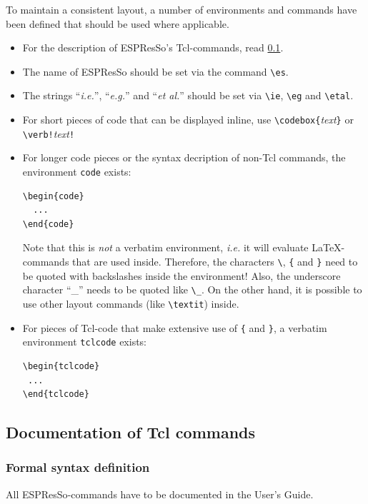 \documentclass[
a4paper,                        %
11pt,                           %
twoside,                        %
footsepline,                    %
headsepline,                    %
headexclude,                    %
footexclude,                    %
pagesize,                       %
bibtotocnumbered,               %
idxtotoc                        %
]{scrreprt}
\newcommand{\es}{\mbox{\textsf{ESPResSo}}\xspace}
\newcommand{\ie}{\textit{i.e.}\xspace}
\newcommand{\eg}{\textit{e.g.}\xspace}
\newcommand{\etal}{\textit{et al.}\xspace}
\begin{document}
To maintain a consistent layout, a number of environments and
commands have been defined that should be used where applicable. 
\begin{itemize}
\item For the description of \es's Tcl-commands, read \ref{tcl_docs}.
\item The name of \es should be set via the command \verb!\es!.
\item The strings ``\ie'', ``\eg'' and ``\etal'' should be set via
  \verb!\ie!, \verb!\eg! and \verb!\etal!.
\item For short pieces of code that can be displayed inline, use
  \verb!\codebox{!\textit{text}\verb!}! or \verb|\verb!|\textit{text}\verb|!|
\item For longer code pieces or the syntax decription of non-Tcl
  commands, the environment \texttt{code} exists:
\begin{verbatim}
\begin{code}
  ...
\end{code}
\end{verbatim}
  Note that this is \emph{not} a verbatim environment, \ie it will
  evaluate \LaTeX-commands that are used inside. Therefore, the
  characters \verb!\!, \verb!{! and \verb!}! need to be quoted with
  backslashes inside the environment!  Also, the underscore character
  ``\_'' needs to be quoted like \verb!\_!. On the other hand, it is
  possible to use other layout commands (like \verb!\textit!) inside.
\item For pieces of Tcl-code that make extensive use of \verb!{! and
    \verb!}!, a verbatim environment \verb!tclcode! exists: 
\begin{verbatim}
\begin{tclcode}
 ...
\end{tclcode}
\end{verbatim}
\end{itemize}

\subsection{Documentation of Tcl commands}
\label{tcl_docs}

\subsubsection{Formal syntax definition}

All \es-commands have to be documented in the User's Guide.
\end{document}

